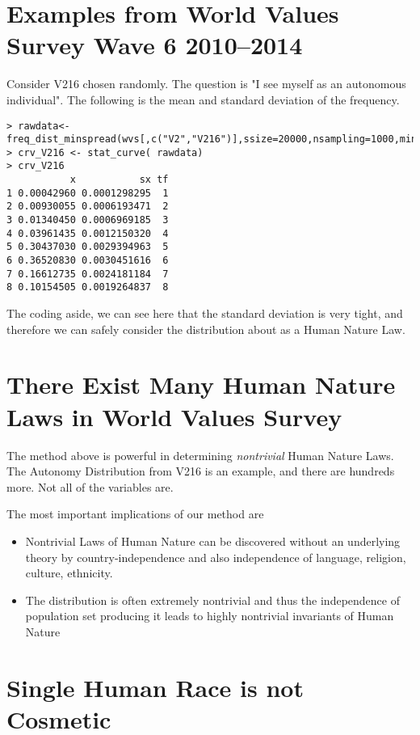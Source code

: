 \documentclass{amsart}
\begin{document}
\section{Examples from World Values Survey Wave 6 2010--2014}

Consider V216 chosen randomly.  The question is "I see myself as an autonomous individual".  The following is the mean and standard deviation of the frequency.


\begin{verbatim}
> rawdata<-freq_dist_minspread(wvs[,c("V2","V216")],ssize=20000,nsampling=1000,minspread=20)
> crv_V216 <- stat_curve( rawdata)
> crv_V216
           x           sx tf
1 0.00042960 0.0001298295  1
2 0.00930055 0.0006193471  2
3 0.01340450 0.0006969185  3
4 0.03961435 0.0012150320  4
5 0.30437030 0.0029394963  5
6 0.36520830 0.0030451616  6
7 0.16612735 0.0024181184  7
8 0.10154505 0.0019264837  8
\end{verbatim}
 
The coding aside, we can see here that the standard deviation is very tight, and therefore we can safely consider the distribution about as a Human Nature Law.

\section{There Exist Many Human Nature Laws in World Values Survey}

The method above is powerful in determining {\em nontrivial} Human Nature Laws.  The Autonomy Distribution from V216 is an example, and there are hundreds more.  Not all of the variables are.  

The most important implications of our method are
\begin{itemize}
\item Nontrivial Laws of Human Nature can be discovered without an underlying theory by country-independence and also independence of language, religion, culture, ethnicity.  
\item The distribution is often extremely nontrivial and thus the independence of population set producing it leads to highly nontrivial invariants of Human Nature
\end{itemize}

\section{Single Human Race is not Cosmetic}
\end{document}
